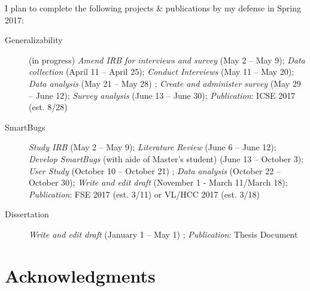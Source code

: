 \documentclass{llncs}
\begin{document}
I plan to complete the following projects \& publications by my defense in Spring 2017:

\begin{description}
	\item[Generalizability] (in progress) \textit{Amend IRB for interviews and survey} (May 2 -- May 9); \textit{Data collection} (April 11 -- April 25); \textit{Conduct Interviews} (May 11 -- May 20); \textit{Data analysis} (May 21 -- May 28) ; \textit{Create and administer survey} (May 29 -- June 12); \textit{Survey analysis} (June 13 -- June 30); \textit{Publication}: ICSE 2017 (est. 8/28)
	\item[SmartBugs] \textit{Study IRB} (May 2 -- May 9); \textit{Literature Review} (June 6 -- June 12); \textit{Develop SmartBugs} (with aide of Master's student) (June 13 -- October 3); \textit{User Study} (October 10 -- October 21) ; \textit{Data analysis} (October 22 -- October 30); \textit{Write and edit draft} (November 1 - March 11/March 18); \textit{Publication}: FSE 2017 (est. 3/11) or VL/HCC 2017 (est. 3/18)
	\item[Dissertation] \textit{Write and edit draft} (January 1 -- May 1) ; \textit{Publication}: Thesis Document
\end{description}





\section*{Acknowledgments}





%

%
\end{document}
